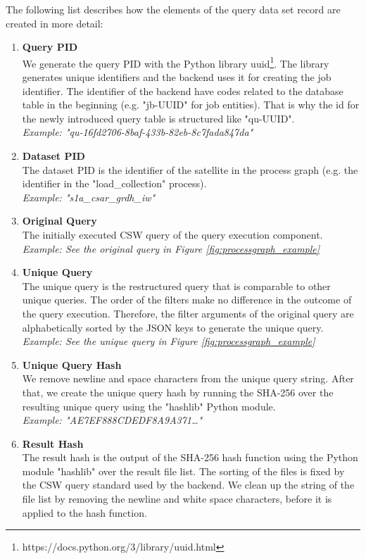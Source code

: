 \documentclass[draft,final]{vutinfth} %
\newcommand{\bgoesswein}[1]{{\color{blue}#1}}
\begin{document}
The following list describes how the elements of the query data set record are created in more detail:
\newpage
\begin{enumerate}
	\item \textbf{Query PID} \\
	We generate the query PID with the Python library uuid\footnote{https://docs.python.org/3/library/uuid.html}. The library generates unique identifiers and the backend uses it for creating the job identifier. The identifier of the backend have codes related to the database table in the beginning (e.g. "jb-UUID" for job entities). That is why the id for the newly introduced query table is structured like "qu-UUID". \\
	\textit{Example: "qu-16fd2706-8baf-433b-82eb-8c7fada847da"}
	\item \textbf{Dataset PID} \\ 
	The dataset PID is the identifier of the satellite in the process graph (e.g. the identifier in the "load\_collection" process). \\
	\textit{Example: "s1a\_csar\_grdh\_iw"}	    	
	\item\textbf{Original Query} \\
	The initially executed CSW query of the query execution component.  \\ 
	\textit{Example: See the original query in Figure \ref{fig:processgraph_example}}	 
	\item \textbf{Unique Query} \\
	The unique query is the restructured query that is comparable to other unique queries. The order of the filters make no difference in the outcome of the query execution. Therefore, the filter arguments of the original query are alphabetically sorted by the JSON keys to generate the unique query. \\
	\textit{Example: See the unique query in Figure \ref{fig:processgraph_example}}	  	 	
	\item \textbf{Unique Query Hash} \\ 
	We remove newline and space characters from the unique query string. After that, we create the unique query hash by running the SHA-256 over the resulting unique query using the "hashlib" Python module.  \\
	\textit{Example: "AE7EF888CDEDF8A9A371\dots"} 
	\newpage
	\item \textbf{Result Hash} \\
	The result hash is the output of the SHA-256 hash function using the Python module "hashlib" over the result file list. \bgoesswein{The sorting of the files is fixed by the CSW query standard used by the backend.} We clean up the string of the file list by removing the newline and white space characters, before it is applied to the hash function. \\

\end{enumerate}
\end{document}
